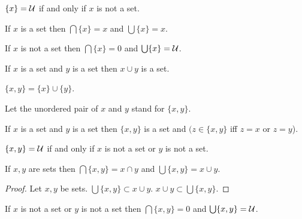 \documentclass[a4paper,draft]{amsproc}
\begin{document}
\begin{forthel}
\begin{theorem}
$\{x\} = \cal{U}$ if and only if $x$ is not a set.
\end{theorem}

\begin{theorem}
If $x$ is a set then $\bigcap \{x\} = x$ 
and $\bigcup \{x\} = x$.
\end{theorem}

\begin{theorem}
If $x$ is not a set then $\bigcap \{x\} = 0$
and $\bigcup \{x\} = \cal{U}$.
\end{theorem}

\begin{axiom}
If $x$ is a set and $y$ is a set then $x \cup y$ is a set.
\end{axiom}

\begin{definition} $\{x,y\} = \{x\} \cup \{y\}$.\end{definition}
Let the unordered pair of $x$ and $y$ stand for $\{x,y\}$.


\begin{theorem}
If $x$ is a set and $y$ is a set 
then $\{x,y\}$ is a set and $(z \in \{x,y\}$ iff $z=x$ or $z=y$). 
\end{theorem}

\begin{theorem}
$\{x,y\} = \cal{U}$ if and only if $x$ is not a set or $y$ is not a set.
\end{theorem}

\begin{theorem}
If $x,y$ are sets then $\bigcap \{x,y\} = x \cap y$
and $\bigcup \{x,y\} = x \cup y$.
\end{theorem}
\begin{proof}
Let $x,y$ be sets.
$\bigcup \{x,y\} \subset x \cup y$.
$x \cup y \subset \bigcup \{x,y\}$.
\end{proof}

\begin{theorem}
If $x$ is not a set or $y$ is not a set then
$\bigcap \{x,y\} = 0$ and $\bigcup \{x,y\} = \cal{U}$.
\end{theorem}


\end{forthel}
\end{document}
